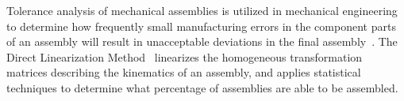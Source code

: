 \documentclass[11pt, twocolumn]{article}
\begin{document}
Tolerance analysis of mechanical assemblies is utilized in mechanical engineering to determine how frequently small manufacturing errors in the component parts of an assembly will result in unacceptable deviations in the final assembly~\cite{Chase1991-survey-of-tolerance-analysis}. The Direct Linearization Method~\cite{Chase1996-geometric-tolerance-analysis} linearizes the homogeneous transformation matrices describing the kinematics of an assembly, and applies statistical techniques to determine what percentage of assemblies are able to be assembled.








\end{document}
